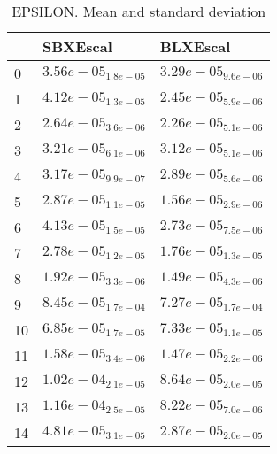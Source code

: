 \documentclass{article}
\begin{document}
\begin{table}
\caption{EPSILON. Mean and standard deviation}
\label{table:mean.EPSILON}
\centering
\begin{scriptsize}
\begin{tabular}{lll}
\hline & SBXEscal &  BLXEscal\\
\hline
0 & \cellcolor{gray25}$  3.56e-05_{ 1.8e-05}$ & \cellcolor{gray95}$  3.29e-05_{ 9.6e-06}$ \\
1 & \cellcolor{gray25}$  4.12e-05_{ 1.3e-05}$ & \cellcolor{gray95}$  2.45e-05_{ 5.9e-06}$ \\
2 & \cellcolor{gray25}$  2.64e-05_{ 3.6e-06}$ & \cellcolor{gray95}$  2.26e-05_{ 5.1e-06}$ \\
3 & \cellcolor{gray25}$  3.21e-05_{ 6.1e-06}$ & \cellcolor{gray95}$  3.12e-05_{ 5.1e-06}$ \\
4 & \cellcolor{gray25}$  3.17e-05_{ 9.9e-07}$ & \cellcolor{gray95}$  2.89e-05_{ 5.6e-06}$ \\
5 & \cellcolor{gray25}$  2.87e-05_{ 1.1e-05}$ & \cellcolor{gray95}$  1.56e-05_{ 2.9e-06}$ \\
6 & \cellcolor{gray25}$  4.13e-05_{ 1.5e-05}$ & \cellcolor{gray95}$  2.73e-05_{ 7.5e-06}$ \\
7 & \cellcolor{gray25}$  2.78e-05_{ 1.2e-05}$ & \cellcolor{gray95}$  1.76e-05_{ 1.3e-05}$ \\
8 & \cellcolor{gray25}$  1.92e-05_{ 3.3e-06}$ & \cellcolor{gray95}$  1.49e-05_{ 4.3e-06}$ \\
9 & \cellcolor{gray25}$  8.45e-05_{ 1.7e-04}$ & \cellcolor{gray95}$  7.27e-05_{ 1.7e-04}$ \\
10 & \cellcolor{gray95}$  6.85e-05_{ 1.7e-05}$ & $  7.33e-05_{ 1.1e-05}$ \\
11 & \cellcolor{gray25}$  1.58e-05_{ 3.4e-06}$ & \cellcolor{gray95}$  1.47e-05_{ 2.2e-06}$ \\
12 & \cellcolor{gray25}$  1.02e-04_{ 2.1e-05}$ & \cellcolor{gray95}$  8.64e-05_{ 2.0e-05}$ \\
13 & \cellcolor{gray25}$  1.16e-04_{ 2.5e-05}$ & \cellcolor{gray95}$  8.22e-05_{ 7.0e-06}$ \\
14 & \cellcolor{gray25}$  4.81e-05_{ 3.1e-05}$ & \cellcolor{gray95}$  2.87e-05_{ 2.0e-05}$ \\
\hline
\end{tabular}
\end{scriptsize}
\end{table}
\
\end{document}
